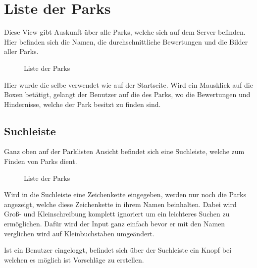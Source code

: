 \section{Liste der Parks}
\label{parklist}

Diese View gibt Auskunft über alle Parks, welche sich auf dem Server befinden. Hier befinden sich die 
Namen, die durchschnittliche Bewertungen und die Bilder aller Parks. 

\begin{figure}[H]
    \begin{center}
      \caption{Liste der Parks}
    \end{center}
\end{figure}

Hier wurde die selbe  verwendet wie auf der Startseite. Wird ein Mausklick auf die 
Boxen betätigt, gelangt der Benutzer auf die  des Parks, wo die Bewertungen und Hindernisse,
welche der Park besitzt zu finden sind. 

\subsection{Suchleiste}

Ganz oben auf der Parklisten Ansicht befindet sich eine Suchleiste, welche zum Finden von Parks dient.

\begin{figure}[H]
    \begin{center}
      \caption{Liste der Parks}
    \end{center}
\end{figure}

Wird in die Suchleiste eine Zeichenkette eingegeben, werden nur noch die Parks angezeigt, welche diese 
Zeichenkette in ihrem Namen beinhalten. Dabei wird Groß- und Kleinschreibung komplett ignoriert um ein 
leichteres Suchen zu ermöglichen. Dafür wird der Input ganz einfach bevor er mit den Namen verglichen wird 
auf Kleinbuchstaben umgeändert.


Ist ein Benutzer eingeloggt, befindet sich über der Suchleiste ein Knopf bei welchen es möglich ist Vorschläge
zu erstellen.